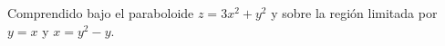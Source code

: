 \item Comprendido bajo el paraboloide $z = 3x^2 + y^2$ y sobre la región limitada por $y = x$ y $x = y^2 - y$.
